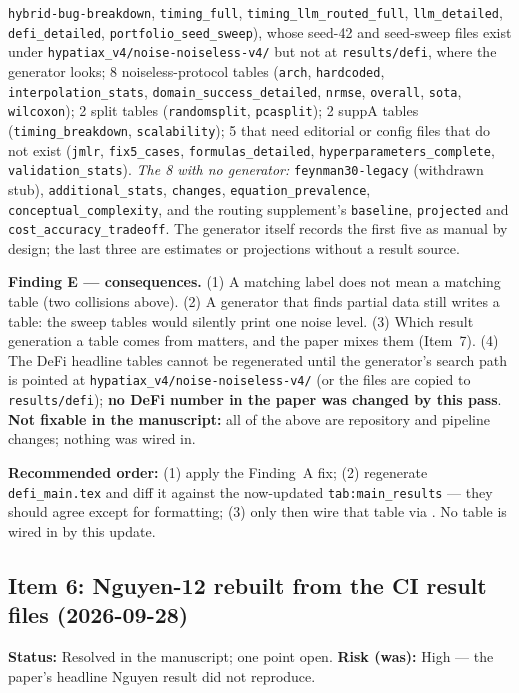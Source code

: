 \documentclass[11pt]{article}
\begin{document}
\texttt{hybrid-bug-breakdown}, \texttt{timing\_full}, \texttt{timing\_llm\_routed\_full},
\texttt{llm\_detailed}, \texttt{defi\_detailed}, \texttt{portfolio\_seed\_sweep}), whose seed-42 and
seed-sweep files exist under \texttt{hypatiax\_v4/noise-noiseless-v4/} but not at
\texttt{results/defi}, where the generator looks; 8 noiseless-protocol tables (\texttt{arch},
\texttt{hardcoded}, \texttt{interpolation\_stats}, \texttt{domain\_success\_detailed},
\texttt{nrmse}, \texttt{overall}, \texttt{sota}, \texttt{wilcoxon}); 2 split tables
(\texttt{randomsplit}, \texttt{pcasplit}); 2 suppA tables (\texttt{timing\_breakdown},
\texttt{scalability}); 5 that need editorial or config files that do not exist
(\texttt{jmlr}, \texttt{fix5\_cases}, \texttt{formulas\_detailed},
\texttt{hyperparameters\_complete}, \texttt{validation\_stats}).
\emph{The 8 with no generator:} \texttt{feynman30-legacy} (withdrawn stub),
\texttt{additional\_stats}, \texttt{changes}, \texttt{equation\_prevalence},
\texttt{conceptual\_complexity}, and the routing supplement's \texttt{baseline},
\texttt{projected} and \texttt{cost\_accuracy\_tradeoff}. The generator itself records the first
five as manual by design; the last three are estimates or projections without a result source.

\textbf{Finding E --- consequences.} (1) A matching label does not mean a matching table (two
collisions above). (2) A generator that finds partial data still writes a table: the sweep
tables would silently print one noise level. (3) Which result generation a table comes from
matters, and the paper mixes them (Item~7). (4) The DeFi headline tables cannot be regenerated
until the generator's search path is pointed at \texttt{hypatiax\_v4/noise-noiseless-v4/} (or the
files are copied to \texttt{results/defi}); \textbf{no DeFi number in the paper was changed by this
pass}. \textbf{Not fixable in the manuscript:} all of the above are repository and pipeline
changes; nothing was wired in.

\textbf{Recommended order:} (1) apply the Finding~A fix; (2) regenerate
\texttt{defi\_main.tex} and diff it against the now-updated
\texttt{tab:main\_results} --- they should agree except for formatting;
(3) only then wire that table via \verb||. No table is wired in by
this update.

\subsection*{Item 6: Nguyen-12 rebuilt from the CI result files (2026-09-28)}
\textbf{Status:} Resolved in the manuscript; one point open.
\textbf{Risk (was):} High --- the paper's headline Nguyen result did not reproduce.
\end{document}
